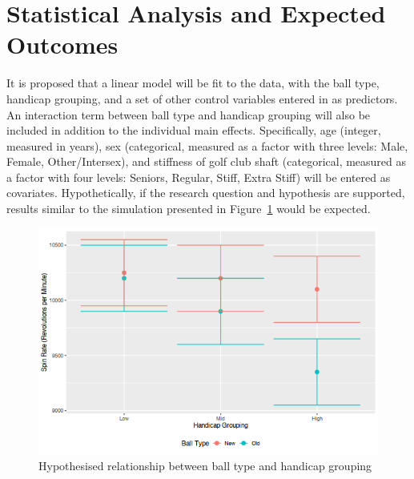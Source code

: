 \documentclass{article}
\begin{document}
\section{Statistical Analysis and Expected Outcomes}
It is proposed that a linear model will be fit to the data, with the ball type, handicap grouping, and a set of other control variables entered in as predictors. 
An interaction term between ball type and handicap grouping will also be included in addition to the individual main effects. 
Specifically, age (integer, measured in years), sex (categorical, measured as a factor with three levels: Male, Female, Other/Intersex), and stiffness of golf club shaft (categorical, measured as a factor with four levels: Seniors, Regular, Stiff, Extra Stiff) will be entered as covariates. 
Hypothetically, if the research question and hypothesis are supported, results similar to the simulation presented in Figure~\ref{fig:expectations} would be expected.

\begin{figure}[t!]
    \centering
    \includegraphics[max width=\linewidth]{expectations}
    \caption{\label{fig:expectations}Hypothesised relationship between ball type and handicap grouping}
\end{figure}
\end{document}
